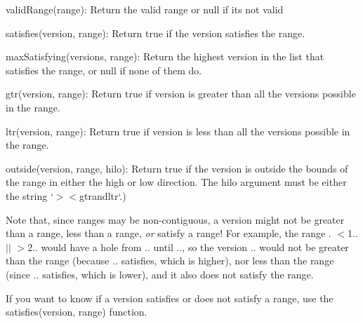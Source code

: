 \begin{DoxyItemize}
\item {\ttfamily valid\+Range(range)}\+: Return the valid range or null if it\textquotesingle{}s not valid
\item {\ttfamily satisfies(version, range)}\+: Return true if the version satisfies the range.
\item {\ttfamily max\+Satisfying(versions, range)}\+: Return the highest version in the list that satisfies the range, or {\ttfamily null} if none of them do.
\item {\ttfamily gtr(version, range)}\+: Return {\ttfamily true} if version is greater than all the versions possible in the range.
\item {\ttfamily ltr(version, range)}\+: Return {\ttfamily true} if version is less than all the versions possible in the range.
\item {\ttfamily outside(version, range, hilo)}\+: Return true if the version is outside the bounds of the range in either the high or low direction. The {\ttfamily hilo} argument must be either the string `\textquotesingle{}$>$\textquotesingle{}$<$gtr{\ttfamily and}ltr`.)
\end{DoxyItemize}

Note that, since ranges may be non-\/contiguous, a version might not be greater than a range, less than a range, {\itshape or} satisfy a range! For example, the range {. $<$1.. $\vert$$\vert$ $>$2..} would have a hole from {..} until {..}, so the version {..} would not be greater than the range (because {..} satisfies, which is higher), nor less than the range (since {..} satisfies, which is lower), and it also does not satisfy the range.

If you want to know if a version satisfies or does not satisfy a range, use the {\ttfamily satisfies(version, range)} function. 